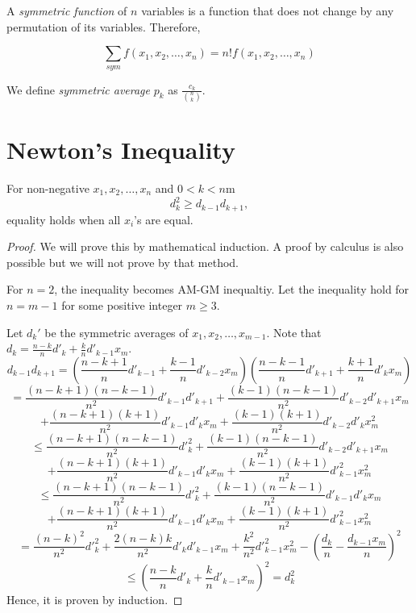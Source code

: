 A \textit{symmetric function} of $n$ variables is a function that does not change by any permutation of its variables. Therefore,

$$\sum_{sym}f(x_1, x_2, \ldots, x_n) = n!f(x_1, x_2, \ldots, x_n)$$

We define \textit{symmetric average} $p_k$ as $\frac{c_k}{\binom{n}{k}}$.

\section{Newton's Inequality}
\begin{theorem}
  For non-negative $x_1, x_2, \ldots, x_n$ and $0<k< n$m
  \begin{equation}
    d_k^2\geq d_{k-1}d_{k + 1},
  \end{equation}
  equality holds when all $x_i$'s are equal.
\end{theorem}

\begin{proof}
  We will prove this by mathematical induction. A proof by calculus is also possible but we will not prove by that method.

  For $n = 2$, the inequality becomes AM-GM inequaltiy. Let the inequality hold for $n = m - 1$ for some positive integer $m\geq
  3$.

  Let $d_k'$ be the symmetric averages of $x_1, x_2, \ldots, x_{m-1}$. Note that $d_k = \frac{n-k}{n}{d'}_k +
  \frac{k}{n}{d'}_{k-1}x_m$.
  \[d_{k-1}d_{k+1} = \left(\frac{n-k+1}{n} {d'}_{k-1} + \frac{k-1}{n} {d'}_{k-2} x_m \right)\left(\frac{n-k-1}{n} {d'}_{k+1} +
  \frac{k+1}{n} {d'}_k x_m \right)\]
  \[= \frac{(n-k+1)(n-k-1)}{n^2} {d'}_{k-1}{d'}_{k+1} + \frac{(k-1)(n-k-1)}{n^2} {d'}_{k-2} {d'}_{k+1} x_m\]
  \[+ \frac{(n-k+1)(k+1)}{n^2} {d'}_{k-1}{d'}_k x_m + \frac{(k-1)(k+1)}{n^2} {d'}_{k-2}{d'}_k x_m^2\]
  \[\le  \frac{(n-k+1)(n-k-1)}{n^2} {d'}_k^2 + \frac{(k-1)(n-k-1)}{n^2} {d'}_{k-2} {d'}_{k+1} x_m\]
  \[+ \frac{(n-k+1)(k+1)}{n^2} {d'}_{k-1}{d'}_k x_m + \frac{(k-1)(k+1)}{n^2} {d'}_{k-1}^2 x_m^2\]
  \[\le  \frac{(n-k+1)(n-k-1)}{n^2} {d'}_k^2 + \frac{(k-1)(n-k-1)}{n^2} {d'}_{k-1} {d'}_{k} x_m\]
  \[+ \frac{(n-k+1)(k+1)}{n^2} {d'}_{k-1}{d'}_k x_m + \frac{(k-1)(k+1)}{n^2} {d'}_{k-1}^2 x_m^2\]
  \[= \frac{(n-k)^2}{n^2} {d'}_k^2 + \frac{2(n-k)k}{n^2} {d'}_k {d'}_{k-1} x_m +\frac{k^2}{n^2} {d'}_{k-1}^2 x_m^2 -
  \left(\frac{d_k}{n} - \frac{d_{k-1}x_m}{n}\right)^2\]
  \[\le  \left(\frac{n-k}{n} {d'}_k + \frac{k}{n} {d'}_{k-1} x_m \right)^2        = d_k^2\]
  Hence, it is proven by induction.
\end{proof}

